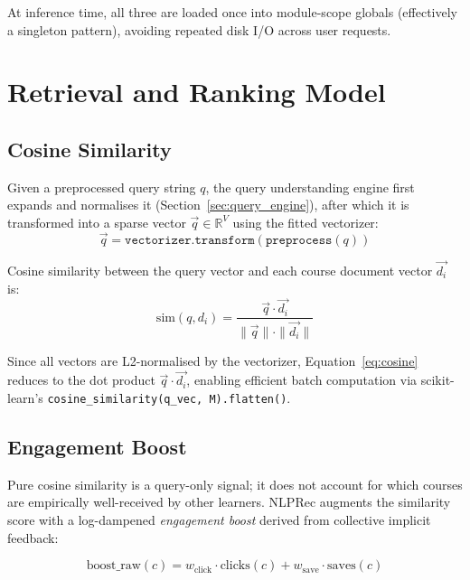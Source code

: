 \documentclass[12pt, a4paper]{article}
\begin{document}
At inference time, all three are loaded once into module-scope globals (effectively a singleton
pattern), avoiding repeated disk I/O across user requests.

\section{Retrieval and Ranking Model}
\label{sec:retrieval}

\subsection{Cosine Similarity}

Given a preprocessed query string $q$, the query understanding engine first expands and normalises
it (Section~\ref{sec:query_engine}), after which it is transformed into a sparse vector
$\vec{q} \in \mathbb{R}^{V}$ using the fitted vectorizer:
\begin{equation}
    \vec{q} = \texttt{vectorizer.transform}(\texttt{preprocess}(q))
    \label{eq:qvec}
\end{equation}

Cosine similarity between the query vector and each course document vector $\vec{d_i}$ is:
\begin{equation}
    \text{sim}(q, d_i) = \frac{\vec{q} \cdot \vec{d_i}}{\|\vec{q}\| \cdot \|\vec{d_i}\|}
    \label{eq:cosine}
\end{equation}

Since all vectors are L2-normalised by the vectorizer, Equation~\ref{eq:cosine} reduces to the
dot product $\vec{q} \cdot \vec{d_i}$, enabling efficient batch computation via scikit-learn's
\texttt{cosine\_similarity(q\_vec, M).flatten()}.

\subsection{Engagement Boost}

Pure cosine similarity is a query-only signal; it does not account for which courses are
empirically well-received by other learners. NLPRec augments the similarity score with a
log-dampened \textit{engagement boost} derived from collective implicit feedback:

\begin{equation}
    \text{boost\_raw}(c) = w_{\text{click}} \cdot \text{clicks}(c) + w_{\text{save}} \cdot \text{saves}(c)
    \label{eq:boost_raw}
\end{equation}
\end{document}
